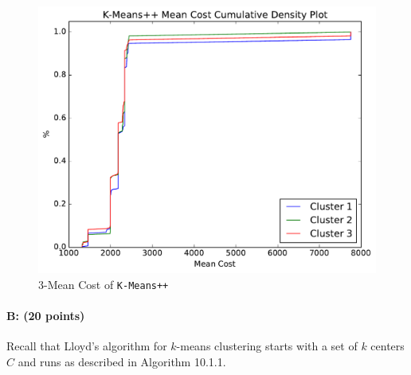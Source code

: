 \documentclass[11pt]{article}
\begin{document}
\begin{figure}[H]
\centering
\includegraphics[width=.75\textwidth]{cdf.pdf}
\caption{ $3$-Mean Cost of {\tt K-Means++}}
\end{figure}



\paragraph{B: (20 points)}
Recall that Lloyd's algorithm for $k$-means clustering starts with a set of $k$ centers $C$ and runs as described in Algorithm 10.1.1.  
\end{document}
